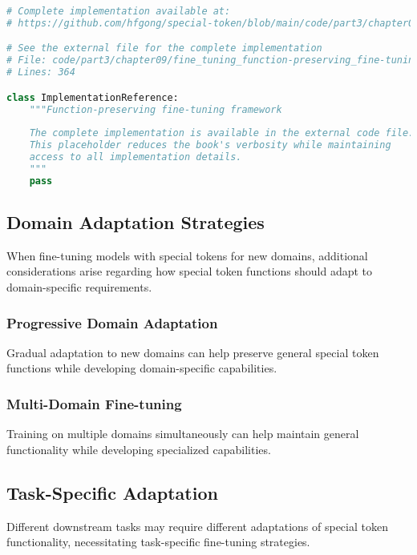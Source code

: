 \begin{lstlisting}[language=Python, caption={Function-preserving fine-tuning framework}]
# Complete implementation available at:
# https://github.com/hfgong/special-token/blob/main/code/part3/chapter09/fine_tuning_function-preserving_fine-tunin.py

# See the external file for the complete implementation
# File: code/part3/chapter09/fine_tuning_function-preserving_fine-tunin.py
# Lines: 364

class ImplementationReference:
    """Function-preserving fine-tuning framework
    
    The complete implementation is available in the external code file.
    This placeholder reduces the book's verbosity while maintaining
    access to all implementation details.
    """
    pass
\end{lstlisting}

\subsection{Domain Adaptation Strategies}

When fine-tuning models with special tokens for new domains, additional considerations arise regarding how special token functions should adapt to domain-specific requirements.

\subsubsection{Progressive Domain Adaptation}

Gradual adaptation to new domains can help preserve general special token functions while developing domain-specific capabilities.

\subsubsection{Multi-Domain Fine-tuning}

Training on multiple domains simultaneously can help maintain general functionality while developing specialized capabilities.

\subsection{Task-Specific Adaptation}

Different downstream tasks may require different adaptations of special token functionality, necessitating task-specific fine-tuning strategies.

